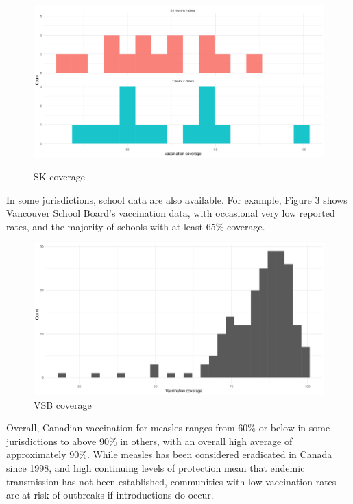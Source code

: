 \documentclass[12pt,a4paper]{article}
\begin{document}
\begin{figure}[!h]
\includegraphics[width=\linewidth]{report-figs/f2.png}
\label{fig:skcov}
\caption{SK coverage}
\end{figure}

In some jurisdictions, school data are also available. For example, Figure 3 shows Vancouver School Board’s vaccination data, with occasional very low reported rates, and the majority of schools with at least 65\% coverage.

\begin{figure}[h!]
\includegraphics[width=\linewidth]{report-figs/f3.png}
\caption{VSB coverage}
\label{fig:vsbcov}
\end{figure}

Overall, Canadian vaccination for measles ranges from 60\% or below in some jurisdictions to above 90\% in others, with an overall high average of approximately 90\%. While measles has been considered eradicated in Canada since 1998, and high continuing levels of protection mean that endemic transmission has not been established, communities with low vaccination rates are at risk of outbreaks if introductions do occur.

\clearpage
\end{document}
